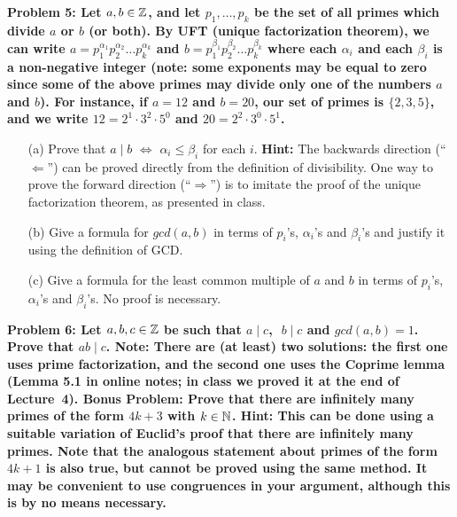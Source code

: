 \documentclass[11pt]{amsart}
\begin{document}
\skv
\bf{Problem 5: }\rm 
Let $a,b\in{\mathbb Z}$, and let $p_1,\ldots, p_k$ be the set of all primes
which divide $a$ or $b$ (or both). By UFT (unique factorization theorem), we can write
$a=p_1^{\alpha_1}p_2^{\alpha_2}\ldots p_k^{\alpha_k}$ and $b=p_1^{\beta_1}p_2^{\beta_2}\ldots p_k^{\beta_k}$
where each $\alpha_i$ and each $\beta_i$ is a non-negative integer (note: some exponents may be
equal to zero since some of the above primes may divide only one of the numbers $a$ and $b$).
For instance, if $a=12$ and $b=20$, our set of primes is $\{2,3,5\}$, and we write
$12=2^1\cdot 3^2\cdot 5^0$ and $20=2^2\cdot 3^0\cdot 5^1$.
\begin{itemize}
\item[(a)] Prove that $a\mid b$ $\iff$ $\alpha_i\leq \beta_i$ for each $i$. {\bf Hint:} The backwards direction (``$\Leftarrow$'')
can be proved directly from the definition of divisibility. One way to prove the forward direction (``$\Rightarrow$'') is to
imitate the proof of the unique factorization theorem, as presented in class.
 
\item[(b)] Give a formula for $gcd(a,b)$ in terms of $p_i$'s, $\alpha_i$'s and $\beta_i$'s
and justify it using the definition of GCD.
\item[(c)] Give a formula for the least common multiple of $a$ and $b$ in terms of $p_i$'s, $\alpha_i$'s and $\beta_i$'s. No proof is necessary.
\end{itemize}
\skv
\bf{Problem 6: }\rm Let $a,b,c\in{\mathbb Z}$ be such that $a\mid c$, $\,\,b\mid c$ and $gcd(a,b)=1$.
Prove that $ab\mid c$.
\bf{Note: }\rm There are (at least) two solutions: the first one uses prime factorization, 
and the second one uses the Coprime lemma (Lemma 5.1 in online notes; in class we proved it at the end of Lecture~4).  
\skv
\bf{Bonus Problem: }\rm Prove that there are infinitely many primes of the form $4k+3$ with $k\in{\mathbb N}$.
{\bf Hint:} This can be done using a suitable variation of Euclid's proof that there are infinitely many primes.
Note that the analogous statement about primes of the form $4k+1$ is also true, but cannot be proved using the same method.
It may be convenient to use congruences in your argument, although this is by no means necessary.
\end{document}
